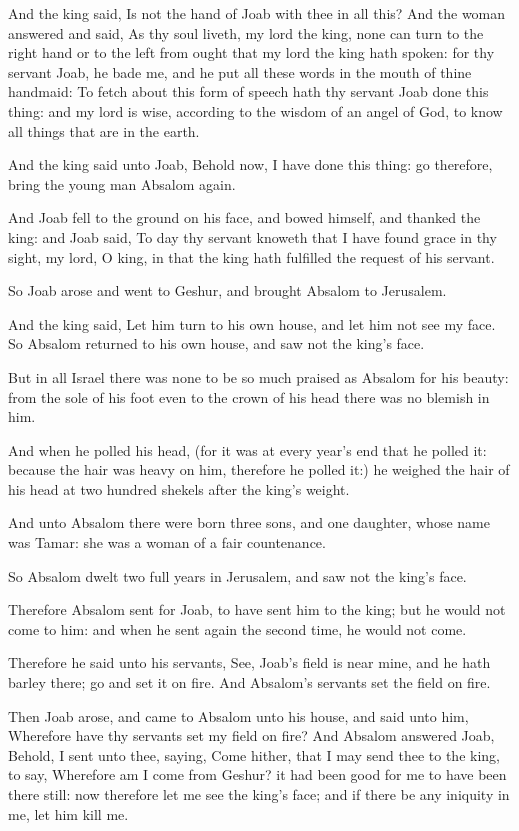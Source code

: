 \Verse And the king said, Is not the hand of Joab with thee in all this?  And the woman answered and said, As thy soul liveth, my lord the king, none can turn to the right hand or to the left from ought that my lord the king hath spoken: for thy servant Joab, he bade me, and he put all these words in the mouth of thine handmaid: \Verse To fetch about this form of speech hath thy servant Joab done this thing: and my lord is wise, according to the wisdom of an angel of God, to know all things that are in the earth.

\Verse And the king said unto Joab, Behold now, I have done this thing: go therefore, bring the young man Absalom again.

\Verse And Joab fell to the ground on his face, and bowed himself, and thanked the king: and Joab said, To day thy servant knoweth that I have found grace in thy sight, my lord, O king, in that the king hath fulfilled the request of his servant.

\Verse So Joab arose and went to Geshur, and brought Absalom to Jerusalem.

\Verse And the king said, Let him turn to his own house, and let him not see my face. So Absalom returned to his own house, and saw not the king's face.

\Verse But in all Israel there was none to be so much praised as Absalom for his beauty: from the sole of his foot even to the crown of his head there was no blemish in him.

\Verse And when he polled his head, (for it was at every year's end that he polled it: because the hair was heavy on him, therefore he polled it:) he weighed the hair of his head at two hundred shekels after the king's weight.

\Verse And unto Absalom there were born three sons, and one daughter, whose name was Tamar: she was a woman of a fair countenance.

\Verse So Absalom dwelt two full years in Jerusalem, and saw not the king's face.

\Verse Therefore Absalom sent for Joab, to have sent him to the king; but he would not come to him: and when he sent again the second time, he would not come.

\Verse Therefore he said unto his servants, See, Joab's field is near mine, and he hath barley there; go and set it on fire. And Absalom's servants set the field on fire.

\Verse Then Joab arose, and came to Absalom unto his house, and said unto him, Wherefore have thy servants set my field on fire?  \Verse And Absalom answered Joab, Behold, I sent unto thee, saying, Come hither, that I may send thee to the king, to say, Wherefore am I come from Geshur? it had been good for me to have been there still: now therefore let me see the king's face; and if there be any iniquity in me, let him kill me.

